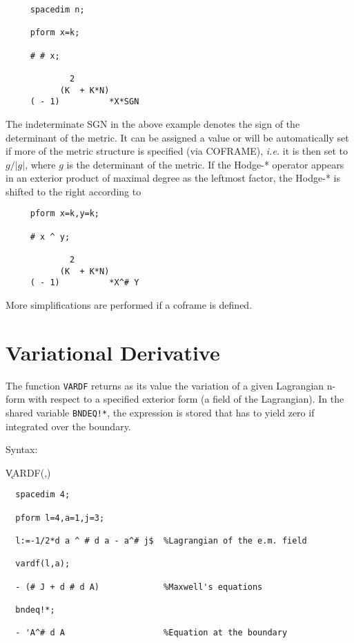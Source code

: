 \begin{verbatim}
     spacedim n;

     pform x=k;

     # # x;

             2
           (K  + K*N)
     ( - 1)          *X*SGN
\end{verbatim}

 
The indeterminate SGN in the above example denotes the sign of the
determinant of the metric. It can be assigned a value or will be
automatically set if more of the metric structure is specified (via
COFRAME), {\em i.e.} it is then set to $g/|g|$, where $g$ is the
determinant of the metric.  If the Hodge-* operator appears in an
exterior product of maximal degree as the leftmost factor, the Hodge-*
is shifted to the right according to

\begin{verbatim}
     pform x=k,y=k;

     # x ^ y;

             2
           (K  + K*N)
     ( - 1)          *X^# Y
\end{verbatim}

More simplifications are performed if a coframe is defined.



\section{Variational Derivative}

 
The function {\tt VARDF}\label{VARDF} returns as its value the
variation of a given Lagrangian n-form with respect to a specified
exterior form (a field of the Lagrangian).  In the shared variable
{\tt BNDEQ!*}, the expression is stored that has to yield zero if
integrated over the boundary.

Syntax:

\hspace*{2em} \k{VARDF}(,)

\example{}

\begin{verbatim}
  spacedim 4;

  pform l=4,a=1,j=3;

  l:=-1/2*d a ^ # d a - a^# j$  %Lagrangian of the e.m. field

  vardf(l,a);

  - (# J + d # d A)             %Maxwell's equations

  bndeq!*;

  - 'A^# d A                    %Equation at the boundary
\end{verbatim}

